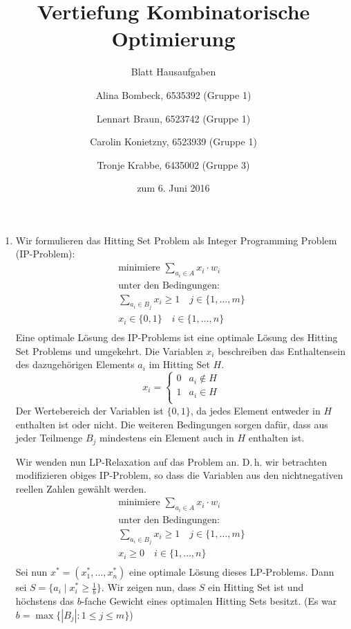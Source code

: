 \documentclass[a4paper]{scrartcl}
\title{Vertiefung Kombinatorische Optimierung}
\subtitle{Blatt {\blattnr} Hausaufgaben}
\author{%
    Alina Bombeck, 6535392 (Gruppe 1) \and
    Lennart Braun, 6523742 (Gruppe 1) \and
    Carolin Konietzny, 6523939 (Gruppe 1) \and
    Tronje Krabbe, 6435002 (Gruppe 3)
}
\date{zum 6. Juni 2016}
\begin{document}
\maketitle


\begin{enumerate}[label=\bfseries \arabic*.]
\item %
    Wir formulieren das Hitting Set Problem als Integer Programming Problem
    (IP-Problem):
    \begin{equation*}
        \begin{gathered}
            \text{minimiere } \sum_{a_i \in A} x_i \cdot w_i \\
            \text{unter den Bedingungen:} \\
            \sum_{a_i \in B_j} x_i \geq 1 \quad j \in \{1, \dotsc, m\} \\
            x_i \in \{0,1\} \quad i \in \{1, \dotsc, n\} \\
        \end{gathered}
    \end{equation*}
    Eine optimale Lösung des IP-Problems ist eine optimale Lösung des Hitting
    Set Problems und umgekehrt. Die Variablen $x_i$ beschreiben das
    Enthaltensein des dazugehörigen Elements $a_i$ im Hitting Set $H$.
    \begin{equation*}
        x_i =
        \begin{cases}
            0 & a_i \notin H \\
            1 & a_i \in H \\
        \end{cases}
    \end{equation*}
    Der Wertebereich der Variablen ist $\{0,1\}$, da jedes Element entweder in
    $H$ enthalten ist oder nicht. Die weiteren Bedingungen sorgen dafür, dass
    aus jeder Teilmenge $B_j$ mindestens ein Element auch in $H$ enthalten ist.

    Wir wenden nun LP-Relaxation auf das Problem an. D.\,h. wir betrachten
    modifizieren obiges IP-Problem, so dass die Variablen aus den
    nichtnegativen reellen Zahlen gewählt werden.
    \begin{equation*}
        \begin{gathered}
            \text{minimiere } \sum_{a_i \in A} x_i \cdot w_i \\
            \text{unter den Bedingungen:} \\
            \sum_{a_i \in B_j} x_i \geq 1 \quad j \in \{1, \dotsc, m\} \\
            x_i \geq 0 \quad i \in \{1, \dotsc, n\} \\
        \end{gathered}
    \end{equation*}
    Sei nun $x^\ast = (x^\ast_1, \dotsc, x^\ast_n)$ eine optimale Lösung dieses
    LP-Problems.
    Dann sei $S = \{ a_i \mid x^\ast_i \geq \frac{1}{b} \}$.
    Wir zeigen nun, dass $S$ ein Hitting Set ist und höchstens das $b$-fache
    Gewicht eines optimalen Hitting Sets besitzt.
    (Es war $b = \max\{|B_j| : 1 \leq j \leq m\}$)


\end{enumerate}
\end{document}
